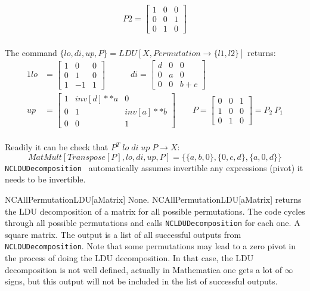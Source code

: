 {{\begin{gather*}
P2 = \begin{bmatrix}1&0&0\\0&0&1\\0&1&0\end{bmatrix}
\end{gather*}} \\
The command $\{lo,di,up,P\}=LDU[X,Permutation\rightarrow\{l1,l2\}]$ returns:
{\footnotesize
\begin{alignat*}{1} 
lo &= \begin{bmatrix}1&0&0\\0&1&0\\1&-1&1\end{bmatrix}\quad\qquad
di = \begin{bmatrix}d&0&0\\0&a&0\\0& 0&b+c\end{bmatrix}\\
up &= \begin{bmatrix}1&inv[d]**a& 0\\0&1&inv[a]**b\\0&0&1\end{bmatrix}\qquad
P = \begin{bmatrix}0&0&1\\1&0&0\\0&1&0\end{bmatrix} = P_2\: P_1
\end{alignat*} } \\
Readily it can be check that $P^T\; lo\; di\; up\; P \rightarrow X$:
\begin{equation*}
MatMult[Transpose[P], lo, di, up, P] = \{ \{ a,b,0\} ,\{ 0,c,d\} ,\{ a,0,d\} \}
\end{equation*}
}
{{\tt NCLDUDecomposition } automatically assumes invertible any 
expressions (pivot) it needs to be invertible.} 

\CommandEntry
{NCAllPermutationLDU[aMatrix]}
{None.}
{NCAllPermutationLDU[aMatrix] returns the LDU decomposition of a matrix 
for all possible permutations. The code cycles through  all possible 
permutations and calls {\tt NCLDUDecomposition} for each one.}
{A square matrix.}
{The output is a list of all successful outputs from {\tt NCLDUDecomposition}.
Note that some permutations may lead to a zero pivot in the process of 
doing the LDU decomposition. In that case, the LDU decomposition is not 
well defined, actually in Mathematica one gets a lot of $\infty$ signs, 
but this output will not be included in the list of successful outputs.  }

